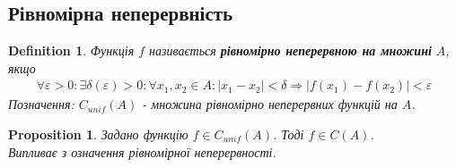 \documentclass[a4paper, 14pt]{article}
\theoremstyle{theoremdd}
\theoremstyle{theoremdd}
\newtheorem{definition}[theorem]{Definition}
\theoremstyle{theoremdd}
\theoremstyle{theoremdd}
\theoremstyle{theoremdd}
\newtheorem{proposition}[theorem]{Proposition}
\theoremstyle{theoremdd}
\theoremstyle{theoremdd}
\theoremstyle{theoremdd}
\begin{document}
\subsection{Рівномірна неперервність}
\begin{definition}
Функція $f$ називається \textbf{рівномірно неперервною на множині} $A$, якщо
\begin{align*}
\forall \varepsilon > 0: \exists \delta(\varepsilon) > 0: \forall x_1,x_2 \in A: |x_1-x_2|<\delta \Rightarrow |f(x_1) - f(x_2)| < \varepsilon
\end{align*}
Позначення: $C_{unif}(A)$ - множина рівномірно неперервних функцій на $A$.
\end{definition}

\begin{proposition}
Задано функцію $f \in C_{unif}(A)$. Тоді $f \in C(A)$.\\
\textit{Випливає з означення рівномірної неперервності.}
\end{proposition}
\end{document}
